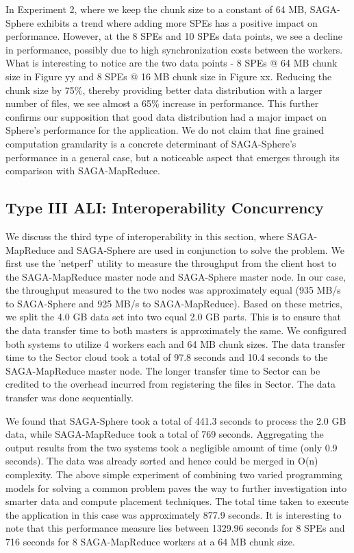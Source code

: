 \documentclass[3p,twocolumn]{elsarticle}
\begin{document}
In Experiment 2, where we keep the chunk size to a constant of 64 MB, SAGA-Sphere 
exhibits a trend where adding more SPEs has a positive impact on performance. However, 
at the 8 SPEs and 10 SPEs data points, we see a decline in performance, possibly 
due to high synchronization costs between the workers. What is interesting to 
notice are the two data points - 8 SPEs @ 64 MB chunk size in Figure yy 
and 8 SPEs @ 16 MB chunk size in Figure xx. Reducing the chunk size by 75\%, 
thereby providing better data distribution with a larger number of files, we 
see almost a 65\% increase in performance. This further confirms our 
supposition that good data distribution had a major impact on Sphere's performance for
the \wc application. We do not claim that fine grained computation 
granularity is a concrete determinant of SAGA-Sphere's performance in a 
general case, but a noticeable aspect that emerges through its comparison with SAGA-MapReduce. 


\subsection{Type III ALI: Interoperability Concurrency}

We discuss the third type of interoperability in this section,
where SAGA-MapReduce and SAGA-Sphere are used in conjunction 
to solve the \wc problem. We first use the 'netperf' 
utility to measure the throughput from the client host to 
the SAGA-MapReduce master node and SAGA-Sphere master node. 
In our case, the throughput measured to the two nodes was 
approximately equal (935 MB/s to SAGA-Sphere and 925 MB/s to SAGA-MapReduce). 
Based on these metrics, we split the 4.0 GB data set 
into two equal 2.0 GB parts. This is to ensure that the data 
transfer time to both masters is approximately the same. We 
configured both systems to utilize 4 workers each 
and 64 MB chunk sizes. The data transfer time to the Sector 
cloud took a total of 97.8 seconds and 10.4 seconds to the 
SAGA-MapReduce master node. The longer transfer time to Sector 
can be credited to the overhead incurred from registering 
the files in Sector. The data transfer was done sequentially. 

We found that SAGA-Sphere took a total of 441.3 seconds to 
process the 2.0 GB data, while SAGA-MapReduce took a total of 
769 seconds. Aggregating the output results from the two systems 
took a negligible amount of time (only 0.9 seconds). The data was 
already sorted and hence could be merged in O(n) complexity. 
The above simple experiment of combining two varied programming 
models for solving a common problem paves the way to further 
investigation into smarter data and compute placement techniques. 
The total time taken to execute the \wc application in this 
case was approximately 877.9 seconds. It is interesting to 
note that this performance measure lies between 1329.96 seconds 
for 8 SPEs and 716 seconds for 8 SAGA-MapReduce workers at 
a 64 MB chunk size. 
\end{document}
